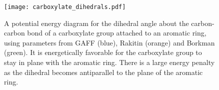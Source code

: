 \documentclass{article}
\begin{document}
  \begin{figure}[!htb]
  \centering
  \texttt{[image: carboxylate\_dihedrals.pdf]}
  \caption{A potential energy diagram for the dihedral angle about the carbon-carbon bond of
  a carboxylate group attached to an aromatic ring, using parameters from GAFF (blue), 
  Rakitin (orange) and Borkman (green). It is energetically favorable for the 
  carboxylate group to stay in plane with the aromatic ring. There is a large energy 
  penalty as the dihedral becomes antiparallel to the plane of the aromatic 
  ring.}\label{fig:carboxylate_dihedral_rb}
  \end{figure}

  \clearpage
\end{document}
